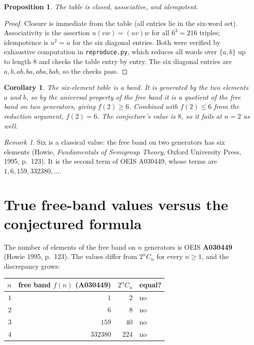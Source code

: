 \documentclass[11pt]{article}
\newtheorem{corollary}[theorem]{Corollary}
\newtheorem{proposition}[theorem]{Proposition}
\theoremstyle{definition}
\theoremstyle{remark}
\newtheorem{remark}[theorem]{Remark}
\begin{document}
\begin{proposition}\label{prop:checks}
The table is closed, associative, and idempotent.
\end{proposition}

\begin{proof}
Closure is immediate from the table (all entries lie in the six-word set).
Associativity is the assertion $u(vw) = (uv)w$ for all $6^3 = 216$ triples;
idempotence is $u^2 = u$ for the six diagonal entries. Both were verified by
exhaustive computation in \texttt{reproduce.py}, which reduces all words over
$\{a,b\}$ up to length $8$ and checks the table entry by entry. The six
diagonal entries are $a, b, ab, ba, aba, bab$, so the checks pass.
\end{proof}

\begin{corollary}
The six-element table is a band. It is generated by the two elements $a$ and
$b$, so by the universal property of the free band it is a quotient of the free
band on two generators, giving $f(2) \ge 6$. Combined with $f(2) \le 6$ from
the reduction argument, $f(2) = 6$. The conjecture's value is $8$, so it fails
at $n = 2$ as well.
\end{corollary}

\begin{remark}
Six is a classical value: the free band on two generators has six elements
(Howie, \emph{Fundamentals of Semigroup Theory}, Oxford University Press, 1995,
p.~123). It is the second term of OEIS A030449, whose terms are
$1, 6, 159, 332380, \dots$.
\end{remark}

\section{True free-band values versus the conjectured formula}

The number of elements of the free band on $n$ generators is OEIS
\textbf{A030449} (Howie 1995, p.~123). The values differ from $2^n C_n$ for
every $n \ge 1$, and the discrepancy grows:

\begin{center}
\begin{tabular}{r r r l}
\toprule
$n$ & free band $f(n)$ (A030449) & $2^n C_n$ & equal? \\
\midrule
$1$ & $1$      & $2$   & no \\
$2$ & $6$      & $8$   & no \\
$3$ & $159$    & $40$  & no \\
$4$ & $332380$ & $224$ & no \\
\bottomrule
\end{tabular}
\end{center}
\end{document}
